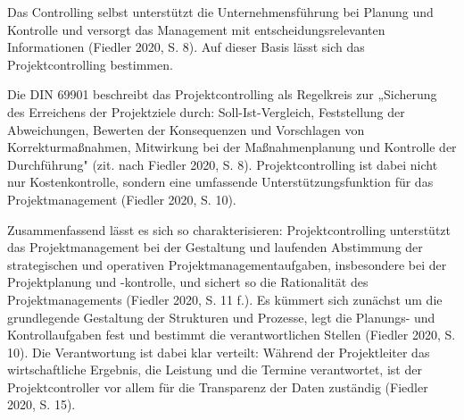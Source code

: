 \documentclass[
    12pt, 
    a4paper,
    ]{scrartcl} %
\begin{document}
Das Controlling selbst unterstützt die Unternehmensführung bei Planung und Kontrolle und versorgt das Management mit entscheidungsrelevanten Informationen (Fiedler 2020, S. 8). Auf dieser Basis lässt sich das Projektcontrolling bestimmen.

Die DIN 69901 beschreibt das Projektcontrolling als Regelkreis zur „Sicherung des Erreichens der Projektziele durch: Soll-Ist-Vergleich, Feststellung der Abweichungen, Bewerten der Konsequenzen und Vorschlagen von Korrekturmaßnahmen, Mitwirkung bei der Maßnahmenplanung und Kontrolle der Durchführung" (zit. nach Fiedler 2020, S. 8). Projektcontrolling ist dabei nicht nur Kostenkontrolle, sondern eine umfassende Unterstützungsfunktion für das Projektmanagement (Fiedler 2020, S. 10).

Zusammenfassend lässt es sich so charakterisieren: Projektcontrolling unterstützt das Projektmanagement bei der Gestaltung und laufenden Abstimmung der strategischen und operativen Projektmanagementaufgaben, insbesondere bei der Projektplanung und -kontrolle, und sichert so die Rationalität des Projektmanagements (Fiedler 2020, S. 11 f.). Es kümmert sich zunächst um die grundlegende Gestaltung der Strukturen und Prozesse, legt die Planungs- und Kontrollaufgaben fest und bestimmt die verantwortlichen Stellen (Fiedler 2020, S. 10). Die Verantwortung ist dabei klar verteilt: Während der Projektleiter das wirtschaftliche Ergebnis, die Leistung und die Termine verantwortet, ist der Projektcontroller vor allem für die Transparenz der Daten zuständig (Fiedler 2020, S. 15).
\end{document}
